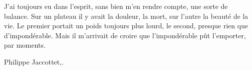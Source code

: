 \documentclass[11pt,twoside,openany]{book}
\newenvironment{lateiDocument}{}{}
\begin{document}
\begin{lateiDocument}
\begin{teiElement}[name={TEI},change={commons\_edition}]
\begin{teiElement}[name={text},type={book},xmlid={book}]
\begin{teiElement}[name={group},type={book},xmlid={book-001}]
\begin{teiElement}[name={group},type={section1},xmlid={section1-001}]
\begin{teiElement}
\begin{teiElement}[name={front}]
\begin{teiElement}[name={epigraph}]
              \begin{teiCit}

                \begin{teiQuote}
J’ai toujours eu dans l’esprit, sans bien m’en rendre compte, une sorte de balance. Sur un plateau il y avait la douleur, la mort, sur l’autre la beauté de la vie. Le premier portait un poids toujours plus lourd, le second, presque rien que d’impondérable. Mais il m’arrivait de croire que l’impondérable pût l’emporter, par moments.
\end{teiQuote}
                \begin{teiBibl}[xmlid={bibl001}]
Philippe Jaccottet,.
\end{teiBibl}
              
\end{teiCit}
            
\end{teiElement}
          
\end{teiElement}
          \begin{teiElement}[name={body},xmlid={body-003}]


\end{teiElement}
\end{teiElement}
\end{teiElement}
\end{teiElement}
\end{teiElement}
\end{teiElement}
\end{lateiDocument}
\end{document}
